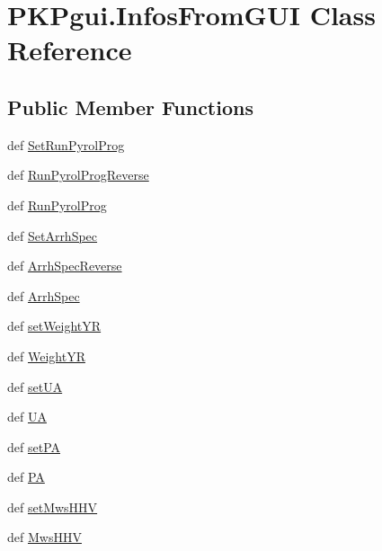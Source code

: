\hypertarget{classPKPgui_1_1InfosFromGUI}{\section{\-P\-K\-Pgui.\-Infos\-From\-G\-U\-I \-Class \-Reference}
\label{classPKPgui_1_1InfosFromGUI}
}
\subsection*{\-Public \-Member \-Functions}
\begin{DoxyCompactItemize}
\item 
def \hyperlink{classPKPgui_1_1InfosFromGUI_a878ee62f58fdc6512140002308a0f287}{\-Set\-Run\-Pyrol\-Prog}
\item 
def \hyperlink{classPKPgui_1_1InfosFromGUI_a54f588fa673fd3ff1f9bb996efe2a99b}{\-Run\-Pyrol\-Prog\-Reverse}
\item 
def \hyperlink{classPKPgui_1_1InfosFromGUI_a4f5efce38827984bc89c4ba2e2ee3f88}{\-Run\-Pyrol\-Prog}
\item 
def \hyperlink{classPKPgui_1_1InfosFromGUI_a9f1612a8ee444a2a4db08913565622d9}{\-Set\-Arrh\-Spec}
\item 
def \hyperlink{classPKPgui_1_1InfosFromGUI_ab54eb8ec8d1dba834fd2b5c40fc6ffc3}{\-Arrh\-Spec\-Reverse}
\item 
def \hyperlink{classPKPgui_1_1InfosFromGUI_a36d1754ee6f619365c10a2f46479ef77}{\-Arrh\-Spec}
\item 
def \hyperlink{classPKPgui_1_1InfosFromGUI_ae266b8719764cc588b56e83e1913a213}{set\-Weight\-Y\-R}
\item 
def \hyperlink{classPKPgui_1_1InfosFromGUI_a61435a0ab9b7575a0128c27e6def7dcf}{\-Weight\-Y\-R}
\item 
def \hyperlink{classPKPgui_1_1InfosFromGUI_a6b9eaab4aa681228cac0cc98a76dbc8b}{set\-U\-A}
\item 
def \hyperlink{classPKPgui_1_1InfosFromGUI_ab5c09b80ace244c07b766643a668c8f7}{\-U\-A}
\item 
def \hyperlink{classPKPgui_1_1InfosFromGUI_a9ff4602da7ff9832cab322cbfbd90a3c}{set\-P\-A}
\item 
def \hyperlink{classPKPgui_1_1InfosFromGUI_a0251e4180756cde78558d7aef0a8276b}{\-P\-A}
\item 
def \hyperlink{classPKPgui_1_1InfosFromGUI_abb472a87318105c95f668904f48d17ef}{set\-Mws\-H\-H\-V}
\item 
def \hyperlink{classPKPgui_1_1InfosFromGUI_a5ccaee00a51f2d193273b857faa6ab86}{\-Mws\-H\-H\-V}

\end{DoxyCompactItemize}
